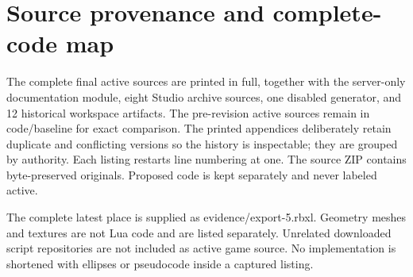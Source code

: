 \chapter{Source provenance and complete-code map}
The complete final active sources are printed in full, together with the server-only documentation module, eight Studio archive sources, one disabled generator, and 12 historical workspace artifacts.\allowbreak{} The pre-revision active sources remain in code/\allowbreak{}baseline for exact comparison.\allowbreak{} The printed appendices deliberately retain duplicate and conflicting versions so the history is inspectable; they are grouped by authority.\allowbreak{} Each listing restarts line numbering at one.\allowbreak{} The source ZIP contains byte-preserved originals.\allowbreak{} Proposed code is kept separately and never labeled active.\allowbreak{}

The complete latest place is supplied as evidence/\allowbreak{}export-5.\allowbreak{}rbxl.\allowbreak{} Geometry meshes and textures are not Lua code and are listed separately.\allowbreak{} Unrelated downloaded script repositories are not included as active game source.\allowbreak{} No implementation is shortened with ellipses or pseudocode inside a captured listing.\allowbreak{}

